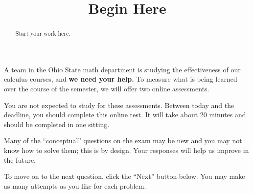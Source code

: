 \documentclass{ximera}
\title{Begin Here}
\begin{document}
\begin{abstract}
  Start your work here.
\end{abstract}
\maketitle

A team in the Ohio State math department is studying the effectiveness
of our calculus courses, and \textbf{we need your help.}  To measure
what is being learned over the course of the semester, we will offer
two online assessments.

You are not expected to study for these assessments.  Between today
and the deadline, you should complete this online test.  It will take
about 20 minutes and should be completed in one sitting.

Many of the ``conceptual'' questions on the exam may be new and you
may not know how to solve them; this is by design.  Your responses
will help us improve in the future.

To move on to the next question, click the ``Next'' button below.  You
may make as many attempts as you like for each problem.
\end{document}
